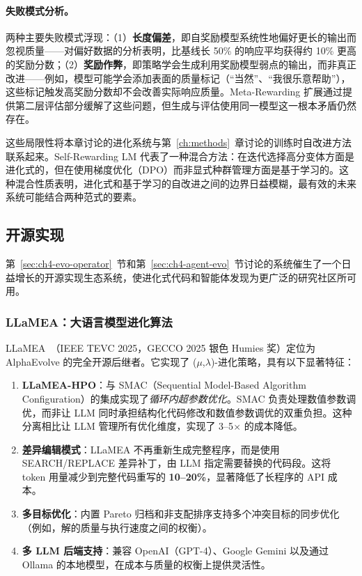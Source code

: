 \paragraph{失败模式分析。}
两种主要失败模式浮现：（1）\textbf{长度偏差}，即自奖励模型系统性地偏好更长的输出而忽视质量——对偏好数据的分析表明，比基线长 50\% 的响应平均获得约 10\% 更高的奖励分数；（2）\textbf{奖励作弊}，即策略学会生成利用奖励模型弱点的输出，而非真正改进——例如，模型可能学会添加表面的质量标记（``当然''、``我很乐意帮助''），这些标记触发高奖励分数却不会改善实际响应质量。Meta-Rewarding 扩展通过提供第二层评估部分缓解了这些问题，但生成与评估使用同一模型这一根本矛盾仍然存在。

这些局限性将本章讨论的进化系统与第~\ref{ch:methods}~章讨论的训练时自改进方法联系起来。Self-Rewarding LM 代表了一种混合方法：在迭代选择高分变体方面是进化式的，但在使用梯度优化（DPO）而非显式种群管理方面是基于学习的。这种混合性质表明，进化式和基于学习的自改进之间的边界日益模糊，最有效的未来系统可能结合两种范式的要素。


\subsection{开源实现}
\label{sec:ch4-opensource}

第~\ref{sec:ch4-evo-operator}~节和第~\ref{sec:ch4-agent-evo}~节讨论的系统催生了一个日益增长的开源实现生态系统，使进化式代码和智能体发现为更广泛的研究社区所可用。

\subsubsection{LLaMEA：大语言模型进化算法}

LLaMEA~\citep{chen2025llamea}（IEEE TEVC 2025，GECCO 2025 银色 Humies 奖）定位为 AlphaEvolve 的完全开源后继者。它实现了 ($\mu$,$\lambda$)-进化策略，具有以下显著特征：

\begin{enumerate}
    \item \textbf{LLaMEA-HPO}：与 SMAC（Sequential Model-Based Algorithm Configuration）的集成实现了\emph{循环内超参数优化}。SMAC 负责处理数值参数调优，而非让 LLM 同时承担结构化代码修改和数值参数调优的双重负担。这种分离相比让 LLM 管理所有优化维度，实现了 3--5$\times$ 的成本降低。

    \item \textbf{差异编辑模式}：LLaMEA 不再重新生成完整程序，而是使用 SEARCH/REPLACE 差异补丁，由 LLM 指定需要替换的代码段。这将 token 用量减少到完整代码重写的 \textbf{10--20\%}，显著降低了长程序的 API 成本。

    \item \textbf{多目标优化}：内置 Pareto 归档和非支配排序支持多个冲突目标的同步优化（例如，解的质量与执行速度之间的权衡）。

    \item \textbf{多 LLM 后端支持}：兼容 OpenAI（GPT-4）、Google Gemini 以及通过 Ollama 的本地模型，在成本与质量的权衡上提供灵活性。
\end{enumerate}

